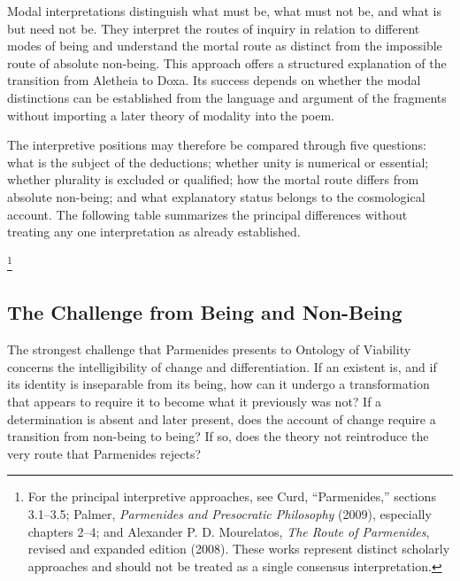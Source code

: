 
Modal interpretations distinguish what
must be, what must not be, and what is
but need not be. They interpret the routes
of inquiry in relation to different modes
of being and understand the mortal route
as distinct from the impossible route
of absolute non-being. This approach
offers a structured explanation of the
transition from Aletheia to Doxa. Its
success depends on whether the modal
distinctions can be established from
the language and argument of the fragments
without importing a later theory of
modality into the poem.


The interpretive positions may therefore
be compared through five questions:
what is the subject of the deductions;
whether unity is numerical or essential;
whether plurality is excluded or qualified;
how the mortal route differs from absolute
non-being; and what explanatory status
belongs to the cosmological account.
The following table summarizes the principal
differences without treating any one
interpretation as already established.



\footnote{For the principal interpretive approaches, see Curd,
``Parmenides,'' sections 3.1--3.5; Palmer, \textit{Parmenides and
Presocratic Philosophy} (2009), especially chapters 2--4; and
Alexander P. D. Mourelatos, \textit{The Route of Parmenides},
revised and expanded edition (2008). These works represent
distinct scholarly approaches and should not be treated as
a single consensus interpretation.}


\subsection{The Challenge from Being and Non-Being}


The strongest challenge that Parmenides presents
to Ontology of Viability concerns the intelligibility
of change and differentiation. If an existent
is, and if its identity is inseparable from its
being, how can it undergo a transformation
that appears to require it to become what it
previously was not? If a determination is absent
and later present, does the account of change
require a transition from non-being to being?
If so, does the theory not reintroduce the
very route that Parmenides rejects?

